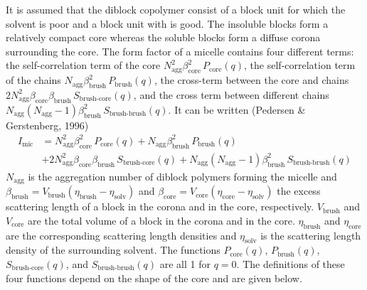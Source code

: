 It is assumed that the diblock copolymer consist of a block unit for
which the solvent is poor and a block unit with is good. The
insoluble blocks form a relatively compact core whereas the soluble
blocks form a diffuse corona surrounding the core. The form factor
of a micelle contains four different terms: the self-correlation
term of the core $N_\text{agg}^2\beta_\text{core}^2\,P_\text{core}(q)$,
the self-correlation term of the chains
$N_\text{agg}\beta_\text{brush}^2\,P_\text{brush}(q)$, the cross-term
between the core and chains
$2N_\text{agg}^2\beta_\text{core}\beta_\text{brush}\,S_\text{brush-core}(q)$,
and the cross term between different chains
$N_\text{agg}(N_\text{agg}-1)\beta_\text{brush}^2\,S_\text{brush-brush}(q)$.
It can be written (Pedersen \& Gerstenberg, 1996)
\begin{align}
I_\text{mic}    &= N_\text{agg}^2\beta_\text{core}^2\,P_\text{core}(q) + N_\text{agg}\beta_\text{brush}^2\,P_\text{brush}(q)  \label{eq:micelle}\\
                &+ 2N_\text{agg}^2\beta_\text{core}\beta_\text{brush}\,S_\text{brush-core}(q) + N_\text{agg}(N_\text{agg}-1)\beta_\text{brush}^2\,S_\text{brush-brush}(q)\nonumber
\end{align}
$N_\text{agg}$ is the aggregation number of diblock polymers forming
the micelle and $\beta_\text{brush}=V_\text{brush}(\eta_\text{brush}-\eta_\text{solv})$
and $\beta_\text{core}=V_\text{core}(\eta_\text{core}-\eta_\text{solv})$
the excess scattering length of a block in the corona and in the core, respectively.
$V_\text{brush}$ and $V_\text{core}$ are the total volume of a block in the corona
and in the core. $\eta_\text{brush}$ and $\eta_\text{core}$ are the corresponding
scattering length densities and $\eta_\text{solv}$ is the scattering length
density of the surrounding solvent. The functions $P_\text{core}(q)$, $P_\text{brush}(q)$,
$S_\text{brush-core}(q)$, and $S_\text{brush-brush}(q)$ are all 1 for $q=0$. The definitions
of these four functions depend on the shape of the core and are given below.

\noindent
